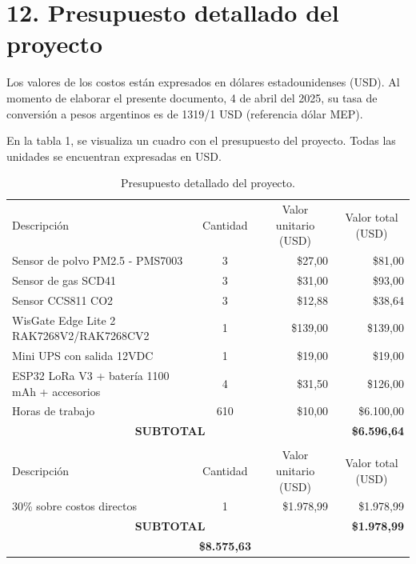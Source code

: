 \documentclass[
11pt, %
]{charter}
\begin{document}
\section{12. Presupuesto detallado del proyecto}
\label{sec:presupuesto}

Los valores de los costos están expresados en dólares estadounidenses (USD). Al momento de elaborar el presente documento, 4 de abril del 2025, su tasa de conversión a pesos argentinos es de 1319/1 USD (referencia dólar MEP).

En la tabla 1, se visualiza un cuadro con el presupuesto del proyecto. Todas las unidades se encuentran expresadas en USD.
\begin{table}[htpb]
\centering
\begin{tabularx}{\linewidth}{@{}|X|c|r|r|@{}}
\hline
\rowcolor[HTML]{C0C0C0} 
\multicolumn{4}{|c|}{\cellcolor[HTML]{C0C0C0}COSTOS DIRECTOS} \\ \hline
\rowcolor[HTML]{C0C0C0} 
Descripción &
  \multicolumn{1}{c|}{Cantidad} &
  \multicolumn{1}{c|}{Valor unitario (USD)} &
  \multicolumn{1}{c|}{Valor total (USD)} \\ \hline
Sensor de polvo PM2.5 - PMS7003 & 3 & \$27,00 & \$81,00 \\ \hline
Sensor de gas SCD41 & 3 & \$31,00 & \$93,00 \\ \hline
Sensor CCS811 CO2 & 3 & \$12,88 & \$38,64 \\ \hline
WisGate Edge Lite 2 RAK7268V2/RAK7268CV2 & 1 & \$139,00 & \$139,00 \\ \hline
Mini UPS con salida 12VDC & 1 & \$19,00 & \$19,00 \\ \hline
ESP32 LoRa V3 + batería 1100 mAh + accesorios & 4 & \$31,50 & \$126,00 \\ \hline
Horas de trabajo & 610 & \$10,00 & \$6.100,00 \\ \hline
\multicolumn{3}{|c|}{\textbf{SUBTOTAL}} & \textbf{\$6.596,64} \\ \hline

\rowcolor[HTML]{C0C0C0} 
\multicolumn{4}{|c|}{\cellcolor[HTML]{C0C0C0}COSTOS INDIRECTOS} \\ \hline
\rowcolor[HTML]{C0C0C0} 
Descripción &
  \multicolumn{1}{c|}{Cantidad} &
  \multicolumn{1}{c|}{Valor unitario (USD)} &
  \multicolumn{1}{c|}{Valor total (USD)} \\ \hline
30\% sobre costos directos & 1 & \$1.978,99 & \$1.978,99 \\ \hline
\multicolumn{3}{|c|}{\textbf{SUBTOTAL}} & \textbf{\$1.978,99} \\ \hline
\rowcolor[HTML]{C0C0C0}
\multicolumn{3}{|c|}{\textbf{TOTAL}} & \textbf{\$8.575,63} \\ \hline
\end{tabularx}
\caption{Presupuesto detallado del proyecto.}
\label{tab:presupuesto}
\end{table}
\end{document}
